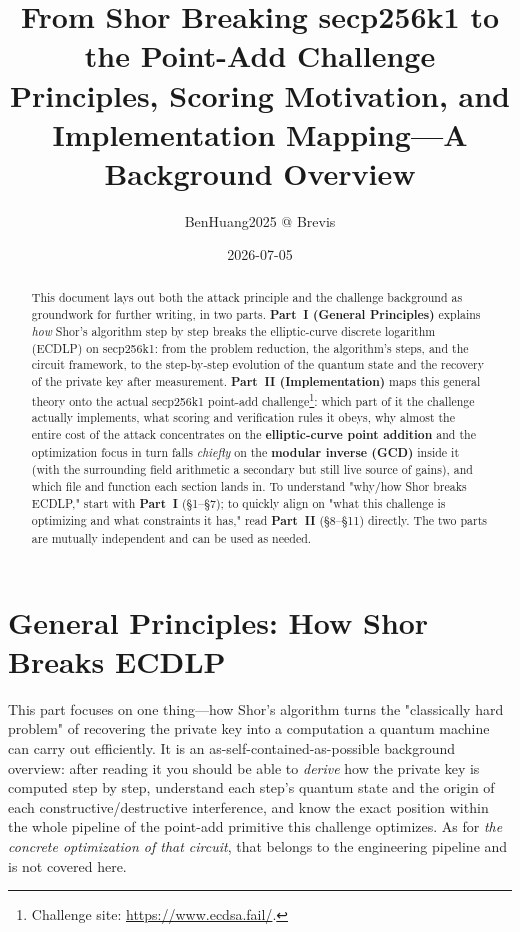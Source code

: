 \documentclass[11pt]{article}
\title{\textbf{From Shor Breaking secp256k1 to the Point-Add Challenge\\
\large Principles, Scoring Motivation, and Implementation Mapping---A Background Overview}}
\author{BenHuang2025 @ Brevis}
\date{2026-07-05}
\begin{document}
\maketitle

\begin{abstract}
This document lays out both the attack principle and the challenge background as groundwork for further writing, in two parts. \textbf{Part~I (General Principles)} explains \emph{how} Shor's algorithm step by step breaks the
elliptic-curve discrete logarithm (ECDLP) on secp256k1: from the problem reduction, the algorithm's steps, and the circuit framework, to the step-by-step evolution of the quantum state and the recovery of the private key after measurement. \textbf{Part~II (Implementation)} maps this
general theory onto the actual secp256k1 point-add challenge\footnote{Challenge site: \url{https://www.ecdsa.fail/}.}: which part of it the challenge actually implements, what scoring and verification rules it obeys, why almost the entire cost of the attack concentrates on the \textbf{elliptic-curve point addition} and the optimization focus in turn falls \emph{chiefly} on the \textbf{modular inverse (GCD)} inside it (with the surrounding field arithmetic a secondary but still live source of gains), and which file and function each section lands in.
To understand "why/how Shor breaks ECDLP," start with \textbf{Part~I} (\S1--\S7); to quickly align on "what this challenge is optimizing and what constraints it has,"
read \textbf{Part~II} (\S8--\S11) directly. The two parts are mutually independent and can be used as needed.
\end{abstract}

\tableofcontents

\part{General Principles: How Shor Breaks ECDLP}

This part focuses on one thing---how Shor's algorithm turns the "classically hard problem" of recovering the private key into a computation a quantum machine can carry out efficiently. It is an
as-self-contained-as-possible background overview: after reading it you should be able to \emph{derive} how the private key is computed step by step, understand each step's
quantum state and the origin of each constructive/destructive interference, and know the exact position within the whole pipeline of the point-add primitive this challenge optimizes. As for \emph{the concrete optimization of that circuit},
that belongs to the engineering pipeline and is not covered here.
\end{document}
